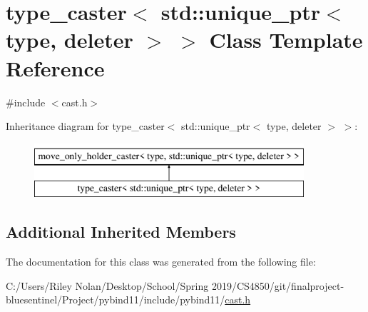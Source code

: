 \hypertarget{classtype__caster_3_01std_1_1unique__ptr_3_01type_00_01deleter_01_4_01_4}{}\section{type\+\_\+caster$<$ std\+::unique\+\_\+ptr$<$ type, deleter $>$ $>$ Class Template Reference}
\label{classtype__caster_3_01std_1_1unique__ptr_3_01type_00_01deleter_01_4_01_4}


{\ttfamily \#include $<$cast.\+h$>$}

Inheritance diagram for type\+\_\+caster$<$ std\+::unique\+\_\+ptr$<$ type, deleter $>$ $>$\+:\begin{figure}[H]
\begin{center}
\leavevmode
\includegraphics[height=2.000000cm]{classtype__caster_3_01std_1_1unique__ptr_3_01type_00_01deleter_01_4_01_4}
\end{center}
\end{figure}
\subsection*{Additional Inherited Members}


The documentation for this class was generated from the following file\+:\begin{DoxyCompactItemize}
\item 
C\+:/\+Users/\+Riley Nolan/\+Desktop/\+School/\+Spring 2019/\+C\+S4850/git/finalproject-\/bluesentinel/\+Project/pybind11/include/pybind11/\mbox{\hyperlink{cast_8h}{cast.\+h}}\end{DoxyCompactItemize}
